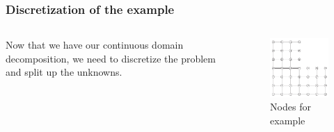 \documentclass{beamer}
\begin{document}
\begin{frame}
\frametitle{Discretization of the example}

\begin{columns}
	\begin{column}{0.5\textwidth}
		Now that we have our continuous domain decomposition, we need to discretize the problem and split up the unknowns.
	\end{column}
	\begin{column}{0.5\textwidth}
		\begin{figure}
			\centering
			\includegraphics[width=\textwidth]{FIG/Saad_Lshape_nodes.png}
			\caption{Nodes for example}
		\end{figure}
	\end{column}
\end{columns}
\end{frame}
\end{document}
